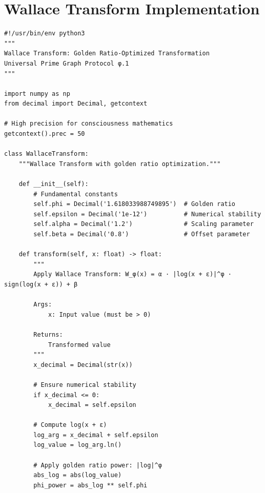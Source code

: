
\section{Wallace Transform Implementation}

\begin{lstlisting}[caption={Complete Wallace Transform Implementation},label={code:wallace_transform}]
#!/usr/bin/env python3
"""
Wallace Transform: Golden Ratio-Optimized Transformation
Universal Prime Graph Protocol φ.1
"""

import numpy as np
from decimal import Decimal, getcontext

# High precision for consciousness mathematics
getcontext().prec = 50

class WallaceTransform:
    """Wallace Transform with golden ratio optimization."""
    
    def __init__(self):
        # Fundamental constants
        self.phi = Decimal('1.618033988749895')  # Golden ratio
        self.epsilon = Decimal('1e-12')          # Numerical stability
        self.alpha = Decimal('1.2')              # Scaling parameter
        self.beta = Decimal('0.8')               # Offset parameter
    
    def transform(self, x: float) -> float:
        """
        Apply Wallace Transform: W_φ(x) = α · |log(x + ε)|^φ · sign(log(x + ε)) + β
        
        Args:
            x: Input value (must be > 0)
        
        Returns:
            Transformed value
        """
        x_decimal = Decimal(str(x))
        
        # Ensure numerical stability
        if x_decimal <= 0:
            x_decimal = self.epsilon
        
        # Compute log(x + ε)
        log_arg = x_decimal + self.epsilon
        log_value = log_arg.ln()
        
        # Apply golden ratio power: |log|^φ
        abs_log = abs(log_value)
        phi_power = abs_log ** self.phi
        

\end{lstlisting}
